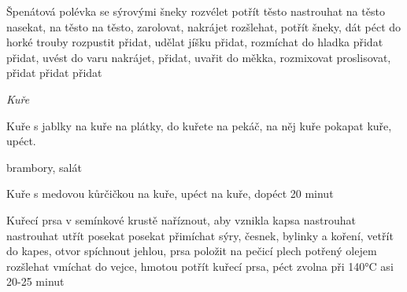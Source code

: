 \documentclass[12pt,a4paper]{article}
\renewcommand{\sidedish}[1]{\item {#1}}
\begin{document}
\begin{recipe}{Špenátová polévka se sýrovými šneky}
   rozvélet
   potřít těsto
   nastrouhat na těsto
   nasekat, na těsto
   na těsto, zarolovat, nakrájet
   rozšlehat, potřít šneky, dát péct do horké trouby
   rozpustit
   přidat, udělat jíšku
   přidat, rozmíchat do hladka
   přidat
   přidat, uvést do varu
   nakrájet, přidat, uvařit do měkka, rozmixovat
   proslisovat, přidat
   přidat
   přidat
\end{recipe}
\newpage

\vspace*{\fill}
\hfill {\Huge\it Kuře}\hfill
\vspace*{\fill}
\newpage

\begin{recipe}{Kuře s jablky}
   na kuře
   na plátky, do kuřete
   na pekáč, na něj kuře
   pokapat kuře, upéct.
  \sidedish{brambory, salát} 
\end{recipe}
\newpage

\begin{recipe}{Kuře s medovou kůrčičkou}
   na kuře, upéct
   na kuře, dopéct 20 minut
\end{recipe}
\newpage

\begin{recipe}{Kuřecí prsa v semínkové krustě}
   naříznout, aby vznikla kapsa
   nastrouhat
   nastrouhat
   utřít
   posekat
   posekat
   přimíchat sýry, česnek, bylinky a koření, vetřít do kapes, otvor spíchnout jehlou, prsa položit na pečicí plech potřený olejem
   rozšlehat
   vmíchat do vejce, hmotou potřít kuřecí prsa, péct zvolna při 140°C asi 20-25 minut
\end{recipe}
\newpage
\end{document}
